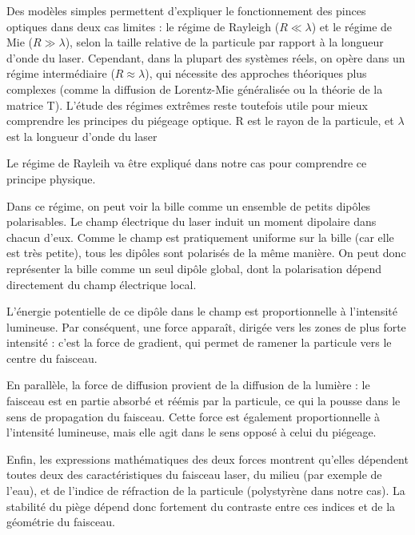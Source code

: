 Des modèles simples permettent d'expliquer le fonctionnement des pinces optiques dans deux cas limites : le régime de Rayleigh ($R \ll \lambda$) et le régime de Mie ($R \gg \lambda$), selon la taille relative de la particule par rapport à la longueur d'onde du laser.
Cependant, dans la plupart des systèmes réels, on opère dans un régime intermédiaire ($R \approx \lambda$), qui nécessite des approches théoriques plus complexes (comme la diffusion de Lorentz-Mie généralisée ou la théorie de la matrice T).
L'étude des régimes extrêmes reste toutefois utile pour mieux comprendre les principes du piégeage optique.
R est le rayon de la particule, et $\lambda$ est la longueur d'onde du laser~\cite{epflExplanationOpticalTweezers}

Le régime de Rayleih va être expliqué dans notre cas pour comprendre ce principe physique.

Dans ce régime, on peut voir la bille comme un ensemble de petits dipôles polarisables. Le champ électrique du laser induit un moment dipolaire dans chacun d'eux. Comme le champ est pratiquement uniforme sur la bille (car elle est très petite), tous les dipôles sont polarisés de la même manière. On peut donc représenter la bille comme un seul dipôle global, dont la polarisation dépend directement du champ électrique local.

L'énergie potentielle de ce dipôle dans le champ est proportionnelle à l'intensité lumineuse. Par conséquent, une force apparaît, dirigée vers les zones de plus forte intensité : c'est la force de gradient, qui permet de ramener la particule vers le centre du faisceau.

En parallèle, la force de diffusion provient de la diffusion de la lumière : le faisceau est en partie absorbé et réémis par la particule, ce qui la pousse dans le sens de propagation du faisceau. Cette force est également proportionnelle à l'intensité lumineuse, mais elle agit dans le sens opposé à celui du piégeage.

Enfin, les expressions mathématiques des deux forces montrent qu'elles dépendent toutes deux des caractéristiques du faisceau laser, du milieu (par exemple de l'eau), et de l'indice de réfraction de la particule (polystyrène dans notre cas). La stabilité du piège dépend donc fortement du contraste entre ces indices et de la géométrie du faisceau.

